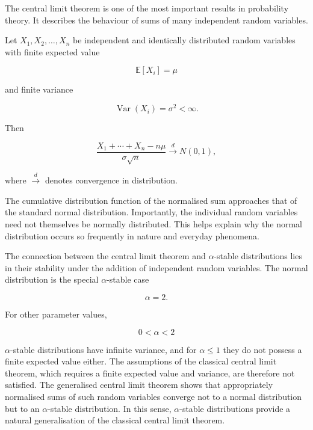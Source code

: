 \documentclass[a4paper, 12pt, openany]{book}
\begin{document}
The central limit theorem is one of the most important results in probability theory. It describes the behaviour of sums of many independent random variables.
\begin{tcolorbox}[colback=blue!5!white,colframe=blue!50!black,title=Definition 5: Central limit theorem (CLT)]
\label{def:CLI}
Let $X_1,X_2,\dots,X_n$ be independent and identically distributed random variables with finite expected value

\[
\mathbb{E}[X_i]=\mu
\]

and finite variance

\[
\operatorname{Var}(X_i)=\sigma^2<\infty.
\]

Then

\[
\frac{X_1+\cdots+X_n-n\mu}{\sigma\sqrt{n}}
\overset{d}{\longrightarrow}
N(0,1),
\]

where $\overset{d}{\longrightarrow}$ denotes convergence in distribution.
\end{tcolorbox}
\begin{tcolorbox}[colback=yellow!5!white, colframe=orange!70!black, title=\textbf{Intuition}, fonttitle=\bfseries]
The cumulative distribution function of the normalised sum approaches that of the standard normal distribution. Importantly, the individual random variables need not themselves be normally distributed. This helps explain why the normal distribution occurs so frequently in nature and everyday phenomena.
\end{tcolorbox}

The connection between the central limit theorem and $\alpha$-stable distributions lies in their stability under the addition of independent random variables. The normal distribution is the special $\alpha$-stable case

\[
\alpha=2.
\]

For other parameter values,

\[
0<\alpha<2
\]

$\alpha$-stable distributions have infinite variance, and for $\alpha\leq1$ they do not possess a finite expected value either. The assumptions of the classical central limit theorem, which requires a finite expected value and variance, are therefore not satisfied. The generalised central limit theorem shows that appropriately normalised sums of such random variables converge not to a normal distribution but to an $\alpha$-stable distribution. In this sense, $\alpha$-stable distributions provide a natural generalisation of the classical central limit theorem.
\end{document}
